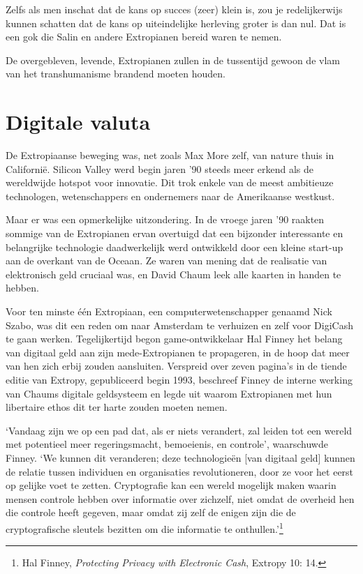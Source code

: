 \documentclass[
  a5paper,
  smalldemyvopaper,11pt,twoside,onecolumn,openright,extrafontsizes,
hidelinks]{memoir}
\begin{document}
Zelfs als men inschat dat de kans op succes (zeer) klein is, zou je
redelijkerwijs kunnen schatten dat de kans op uiteindelijke herleving
groter is dan nul. Dat is een gok die Salin en andere Extropianen bereid
waren te nemen.

De overgebleven, levende, Extropianen zullen in de tussentijd gewoon de
vlam van het transhumanisme brandend moeten houden.

\section{Digitale valuta}\label{digitale-valuta}

De Extropiaanse beweging was, net zoals Max More zelf, van nature thuis
in Californië. Silicon Valley werd begin jaren '90 steeds meer erkend
als de wereldwijde hotspot voor innovatie. Dit trok enkele van de meest
ambitieuze technologen, wetenschappers en ondernemers naar de
Amerikaanse westkust.

Maar er was een opmerkelijke uitzondering. In de vroege jaren '90
raakten sommige van de Extropianen ervan overtuigd dat een bijzonder
interessante en belangrijke technologie daadwerkelijk werd ontwikkeld
door een kleine start-up aan de overkant van de Oceaan. Ze waren van
mening dat de realisatie van elektronisch geld cruciaal was, en David
Chaum leek alle kaarten in handen te hebben.

Voor ten minste één Extropiaan, een computerwetenschapper genaamd Nick
Szabo, was dit een reden om naar Amsterdam te verhuizen en zelf voor
DigiCash te gaan werken. Tegelijkertijd begon game-ontwikkelaar Hal
Finney het belang van digitaal geld aan zijn mede-Extropianen te
propageren, in de hoop dat meer van hen zich erbij zouden aansluiten.
Verspreid over zeven pagina's in de tiende editie van Extropy,
gepubliceerd begin 1993, beschreef Finney de interne werking van Chaums
digitale geldsysteem en legde uit waarom Extropianen met hun libertaire
ethos dit ter harte zouden moeten nemen.

`Vandaag zijn we op een pad dat, als er niets verandert, zal leiden tot
een wereld met potentieel meer regeringsmacht, bemoeienis, en controle',
waarschuwde Finney. `We kunnen dit veranderen; deze technologieën {[}van
digitaal geld{]} kunnen de relatie tussen individuen en organisaties
revolutioneren, door ze voor het eerst op gelijke voet te zetten.
Cryptografie kan een wereld mogelijk maken waarin mensen controle hebben
over informatie over zichzelf, niet omdat de overheid hen die controle
heeft gegeven, maar omdat zij zelf de enigen zijn die de cryptografische
sleutels bezitten om die informatie te onthullen.'\footnote{Hal Finney,
  \emph{Protecting Privacy with Electronic Cash}, Extropy 10: 14.}
\end{document}
